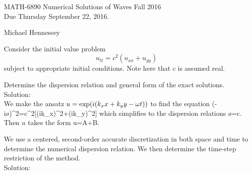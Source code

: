 
\pagestyle{empty}


\begin{center}
\large{ MATH-6890 \hspace{1in} Numerical Solutions of Waves  \hspace{1in}Fall 2016 \\ Due Thursday September 22, 2016.}\end{center}
Michael Hennessey

\bigskip
{} \ec
\benum 
	\item Consider the initial value problem
	$$u_{tt}=c^2(u_{xx}+u_{yy})$$
	subject to appropriate initial conditions. Note here that $c$ is assumed real.
	\benum
		\item Determine the dispersion relation and general form of the exact solutions.\\
		
		Solution:\\
		
		We make the ansatz $u=\exp(i(k_x x+k_y y-\omega t))$ to find the equation
		\bq (-i\o)^2=c^2[(ik_x)^2+(ik_y)^2]\eq
		which simplifies to the dispersion relations
		\bq \o=\pm c.\eq
		Then $u$ takes the form
		\bq u=A\exp[i(k_x x+k_y y-c\sqrt{k_x^2+k_y^2}t)]+B\exp[i(k_x x+k_y 				  y+c\sqrt{k_x^2+k_y^2}t)].\eq
		
		\item We use a centered, second-order accurate discretization in both space and time to determine the numerical dispersion relation. We then determine the time-step restriction of the method.\\
		
			Solution:\\
			
